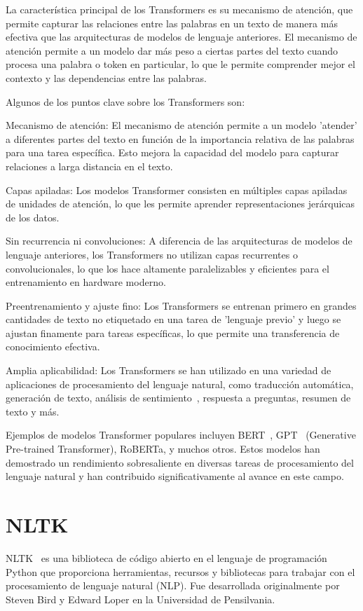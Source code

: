 La característica principal de los Transformers es su mecanismo de atención, que permite capturar las relaciones entre las palabras en un texto de manera más efectiva que las arquitecturas de modelos de lenguaje anteriores. El mecanismo de atención permite a un modelo dar más peso a ciertas partes del texto cuando procesa una palabra o token en particular, lo que le permite comprender mejor el contexto y las dependencias entre las palabras.

Algunos de los puntos clave sobre los Transformers son:

Mecanismo de atención: El mecanismo de atención permite a un modelo 'atender' a diferentes partes del texto en función de la importancia relativa de las palabras para una tarea específica. Esto mejora la capacidad del modelo para capturar relaciones a larga distancia en el texto.

Capas apiladas: Los modelos Transformer consisten en múltiples capas apiladas de unidades de atención, lo que les permite aprender representaciones jerárquicas de los datos.

Sin recurrencia ni convoluciones: A diferencia de las arquitecturas de modelos de lenguaje anteriores, los Transformers no utilizan capas recurrentes o convolucionales, lo que los hace altamente paralelizables y eficientes para el entrenamiento en hardware moderno.

Preentrenamiento y ajuste fino: Los Transformers se entrenan primero en grandes cantidades de texto no etiquetado en una tarea de 'lenguaje previo' y luego se ajustan finamente para tareas específicas, lo que permite una transferencia de conocimiento efectiva.

Amplia aplicabilidad: Los Transformers se han utilizado en una variedad de aplicaciones de procesamiento del lenguaje natural, como traducción automática, generación de texto, análisis de sentimiento~\cite{UrdanetaTransformers}, respuesta a preguntas, resumen de texto y más.

Ejemplos de modelos Transformer populares incluyen BERT~\cite{devlin2019bert}, GPT~\cite{chatgpt1} (Generative Pre-trained Transformer), RoBERTa, y muchos otros. Estos modelos han demostrado un rendimiento sobresaliente en diversas tareas de procesamiento del lenguaje natural y han contribuido significativamente al avance en este campo.



\section{NLTK}
NLTK~\cite{NLTK1} es una biblioteca de código abierto en el lenguaje de programación Python que proporciona herramientas, recursos y bibliotecas para trabajar con el procesamiento de lenguaje natural (NLP). Fue desarrollada originalmente por Steven Bird y Edward Loper en la Universidad de Pensilvania.

